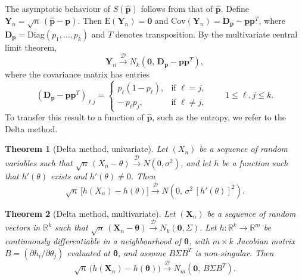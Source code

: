 The asymptotic behaviour of $S(\widehat{\mathbf{p}})$ follows from that of $\widehat{\mathbf{p}}$. Define $\mathbf{Y}_n=\sqrt{n}\,(\widehat{\mathbf{p}}-\mathbf{p})$. Then $\mathrm{E}(\mathbf{Y}_n)=\mathbf{0}$ and $\mathrm{Cov}(\mathbf{Y}_n)=\mathbf{D_p}-\mathbf{p}\mathbf{p}^{T}$, where $\mathbf{D_p}=\mathrm{Diag}(p_1,\dots,p_k)$ and $T$ denotes transposition. By the multivariate central limit theorem,
\begin{equation}
	\mathbf{Y}_n\xrightarrow{\mathscr{D}}N_k\!\left(\mathbf{0},\,\mathbf{D_p}-\mathbf{p}\mathbf{p}^{T}\right),
	\label{eq:Cov}
\end{equation}
where the covariance matrix has entries
\begin{equation}
	\left(\mathbf{D_p}-\mathbf{p}\mathbf{p}^{T}\right)_{\ell j}=
	\begin{cases}
		p_\ell(1-p_\ell), & \text{if } \ell=j,\\[4pt]
		-\,p_\ell p_j, & \text{if } \ell\neq j,
	\end{cases}
	\qquad 1\leq\ell,j\leq k.
	\label{eq:CovEntries}
\end{equation}
To transfer this result to a function of $\widehat{\mathbf{p}}$, such as the entropy, we refer to the Delta method.

\theoremstyle{plain}
\newtheorem{theorem}{Theorem}

\begin{theorem}[Delta method, univariate]
	Let $(X_n)$ be a sequence of random variables such that $\sqrt{n}\,(X_n-\theta)\xrightarrow{\mathscr{D}}N(0,\sigma^2)$, and let $h$ be a function such that $h'(\theta)$ exists and $h'(\theta)\neq0$. Then
	\[
	\sqrt{n}\,\big[h(X_n)-h(\theta)\big]\xrightarrow{\mathscr{D}}N\!\left(0,\,\sigma^2\,[h'(\theta)]^2\right).
	\]
\end{theorem}

\begin{theorem}[Delta method, multivariate]
	Let $(\mathbf{X}_n)$ be a sequence of random vectors in $\mathbb{R}^k$ such that $\sqrt{n}\,(\mathbf{X}_n-\boldsymbol{\theta})\xrightarrow{\mathscr{D}}N_k(\mathbf{0},\Sigma)$. Let $h\colon\mathbb{R}^k\to\mathbb{R}^m$ be continuously differentiable in a neighbourhood of $\boldsymbol{\theta}$, with $m\times k$ Jacobian matrix $B=\left(\partial h_i/\partial\theta_j\right)$ evaluated at $\boldsymbol{\theta}$, and assume $B\Sigma B^{T}$ is non-singular. Then
	\[
	\sqrt{n}\,\big(h(\mathbf{X}_n)-h(\boldsymbol{\theta})\big)\xrightarrow{\mathscr{D}}N_m\!\left(\mathbf{0},\,B\Sigma B^{T}\right).
	\]
\end{theorem}

